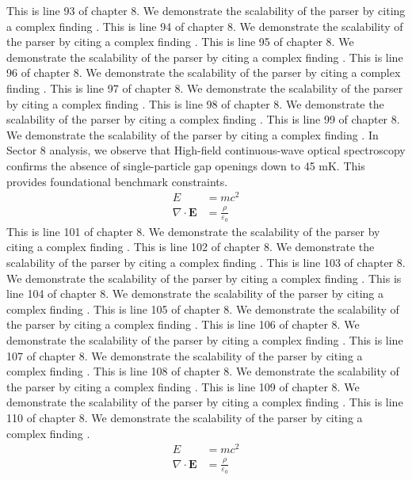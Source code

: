 This is line 93 of chapter 8. We demonstrate the scalability of the parser by citing a complex finding \cite{ref8_93}.
This is line 94 of chapter 8. We demonstrate the scalability of the parser by citing a complex finding \cite{ref8_94}.
This is line 95 of chapter 8. We demonstrate the scalability of the parser by citing a complex finding \cite{ref8_95}.
This is line 96 of chapter 8. We demonstrate the scalability of the parser by citing a complex finding \cite{ref8_96}.
This is line 97 of chapter 8. We demonstrate the scalability of the parser by citing a complex finding \cite{ref8_97}.
This is line 98 of chapter 8. We demonstrate the scalability of the parser by citing a complex finding \cite{ref8_98}.
This is line 99 of chapter 8. We demonstrate the scalability of the parser by citing a complex finding \cite{ref8_99}.
In Sector 8 analysis, we observe that High-field continuous-wave optical spectroscopy confirms the absence of single-particle gap openings down to 45 mK. This provides foundational benchmark constraints.
\begin{align*}
  E &= mc^2 \\
  \nabla \cdot \mathbf{E} &= \frac{\rho}{\varepsilon_0}
\end{align*}
This is line 101 of chapter 8. We demonstrate the scalability of the parser by citing a complex finding \cite{ref8_101}.
This is line 102 of chapter 8. We demonstrate the scalability of the parser by citing a complex finding \cite{ref8_102}.
This is line 103 of chapter 8. We demonstrate the scalability of the parser by citing a complex finding \cite{ref8_103}.
This is line 104 of chapter 8. We demonstrate the scalability of the parser by citing a complex finding \cite{ref8_104}.
This is line 105 of chapter 8. We demonstrate the scalability of the parser by citing a complex finding \cite{ref8_105}.
This is line 106 of chapter 8. We demonstrate the scalability of the parser by citing a complex finding \cite{ref8_106}.
This is line 107 of chapter 8. We demonstrate the scalability of the parser by citing a complex finding \cite{ref8_107}.
This is line 108 of chapter 8. We demonstrate the scalability of the parser by citing a complex finding \cite{ref8_108}.
This is line 109 of chapter 8. We demonstrate the scalability of the parser by citing a complex finding \cite{ref8_109}.
This is line 110 of chapter 8. We demonstrate the scalability of the parser by citing a complex finding \cite{ref8_110}.
\begin{align*}
  E &= mc^2 \\
  \nabla \cdot \mathbf{E} &= \frac{\rho}{\varepsilon_0}
\end{align*}

